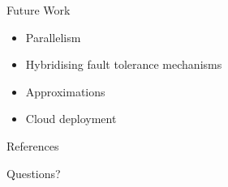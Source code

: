 \documentclass{beamer}
\begin{document}
\begin{frame}{Future Work}
\begin{itemize}
	\item Parallelism
	\item Hybridising fault tolerance mechanisms
	\item Approximations
	\item Cloud deployment
\end{itemize}
\end{frame}

\begin{frame}[allowframebreaks]{References}


\end{frame}

\begin{frame}{Questions?}
\end{frame}
\end{document}
